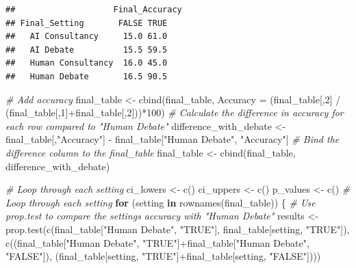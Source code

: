 \documentclass[
]{article}
\newenvironment{Shaded}{\begin{snugshade}}{\end{snugshade}}
\newcommand{\AttributeTok}[1]{\textcolor[rgb]{0.77,0.63,0.00}{#1}}
\newcommand{\CommentTok}[1]{\textcolor[rgb]{0.56,0.35,0.01}{\textit{#1}}}
\newcommand{\ControlFlowTok}[1]{\textcolor[rgb]{0.13,0.29,0.53}{\textbf{#1}}}
\newcommand{\DecValTok}[1]{\textcolor[rgb]{0.00,0.00,0.81}{#1}}
\newcommand{\FunctionTok}[1]{\textcolor[rgb]{0.00,0.00,0.00}{#1}}
\newcommand{\NormalTok}[1]{#1}
\newcommand{\OtherTok}[1]{\textcolor[rgb]{0.56,0.35,0.01}{#1}}
\newcommand{\SpecialCharTok}[1]{\textcolor[rgb]{0.00,0.00,0.00}{#1}}
\newcommand{\StringTok}[1]{\textcolor[rgb]{0.31,0.60,0.02}{#1}}
\begin{document}
\begin{verbatim}
##                    Final_Accuracy
## Final_Setting       FALSE TRUE
##   AI Consultancy     15.0 61.0
##   AI Debate          15.5 59.5
##   Human Consultancy  16.0 45.0
##   Human Debate       16.5 90.5
\end{verbatim}

\begin{Shaded}
\begin{Highlighting}[]
\CommentTok{\# Add accuracy}
\NormalTok{final\_table }\OtherTok{\textless{}{-}} \FunctionTok{cbind}\NormalTok{(final\_table, }\AttributeTok{Accuracy =}\NormalTok{ (final\_table[,}\DecValTok{2}\NormalTok{] }\SpecialCharTok{/}\NormalTok{ (final\_table[,}\DecValTok{1}\NormalTok{]}\SpecialCharTok{+}\NormalTok{final\_table[,}\DecValTok{2}\NormalTok{]))}\SpecialCharTok{*}\DecValTok{100}\NormalTok{)}
\CommentTok{\# Calculate the difference in accuracy for each row compared to "Human Debate"}
\NormalTok{difference\_with\_debate }\OtherTok{\textless{}{-}}\NormalTok{ final\_table[,}\StringTok{"Accuracy"}\NormalTok{] }\SpecialCharTok{{-}}\NormalTok{ final\_table[}\StringTok{"Human Debate"}\NormalTok{, }\StringTok{"Accuracy"}\NormalTok{]}
\CommentTok{\# Bind the difference column to the final\_table}
\NormalTok{final\_table }\OtherTok{\textless{}{-}} \FunctionTok{cbind}\NormalTok{(final\_table, difference\_with\_debate)}

\CommentTok{\# Loop through each setting}
\NormalTok{ci\_lowers }\OtherTok{\textless{}{-}} \FunctionTok{c}\NormalTok{()}
\NormalTok{ci\_uppers }\OtherTok{\textless{}{-}} \FunctionTok{c}\NormalTok{()}
\NormalTok{p\_values }\OtherTok{\textless{}{-}} \FunctionTok{c}\NormalTok{()}
\CommentTok{\# Loop through each setting}
\ControlFlowTok{for}\NormalTok{ (setting }\ControlFlowTok{in} \FunctionTok{rownames}\NormalTok{(final\_table)) \{}
  \CommentTok{\# Use prop.test to compare the setting\textquotesingle{}s accuracy with "Human Debate"}
\NormalTok{  results }\OtherTok{\textless{}{-}} \FunctionTok{prop.test}\NormalTok{(}\FunctionTok{c}\NormalTok{(final\_table[}\StringTok{"Human Debate"}\NormalTok{, }\StringTok{"TRUE"}\NormalTok{], final\_table[setting, }\StringTok{"TRUE"}\NormalTok{]), }\FunctionTok{c}\NormalTok{((final\_table[}\StringTok{"Human Debate"}\NormalTok{, }\StringTok{"TRUE"}\NormalTok{]}\SpecialCharTok{+}\NormalTok{final\_table[}\StringTok{"Human Debate"}\NormalTok{, }\StringTok{"FALSE"}\NormalTok{]), (final\_table[setting, }\StringTok{"TRUE"}\NormalTok{]}\SpecialCharTok{+}\NormalTok{final\_table[setting, }\StringTok{"FALSE"}\NormalTok{])))}
  

\end{Highlighting}
\end{Shaded}
\end{document}
